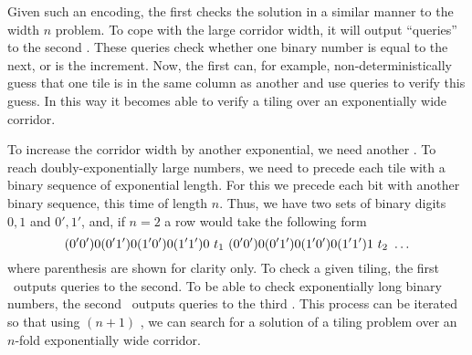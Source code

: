 Given such an encoding, the first \FFT{} checks the solution in a similar manner to the width $n$ problem.
To cope with the large corridor width, it will output ``queries'' to the second \FFT.
These queries check whether one binary number is equal to the next, or is the increment.
Now, the first \FFT{} can, for example, non-deterministically guess that one tile is in the same column as another and use queries to verify this guess.
In this way it becomes able to verify a tiling over an exponentially wide corridor. 

To increase the corridor width by another exponential, we need another \FFT.
To reach doubly-exponentially large numbers, we need to precede each tile with a binary sequence of exponential length.
For this we precede each bit with another binary sequence, this time of length $n$.
Thus, we have two sets of binary digits $0,1$ and $0', 1'$, and, if $n = 2$ a row would take the following form
\[
    (0'0') 0 (0'1') 0 (1'0') 0 (1'1') 0\ \tile_1\ %
    (0'0') 0 (0'1') 0 (1'0') 0 (1'1') 1\ \tile_2\ %
    \ldots 
\]
where parenthesis are shown for clarity only.
To check a given tiling, the first \FFT\ outputs queries to the second.
To be able to check exponentially long binary numbers, the second \FFT\ outputs queries to the third \FFT.
This process can be iterated so that using $(n+1)$ \FFT, we can search for a solution of a tiling problem over an $n$-fold exponentially wide corridor.






